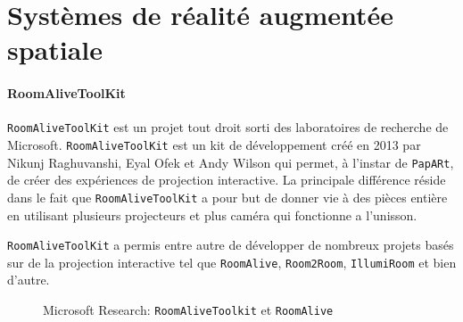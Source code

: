 \section{Systèmes de réalité augmentée spatiale}
\label{sec:SARother}
\paragraph{RoomAliveToolKit} \texttt{RoomAliveToolKit}\cite{Jones:2014:RME:2642918.2647383} est un projet tout droit sorti des laboratoires de recherche de Microsoft. \texttt{RoomAliveToolKit} est un kit de développement créé en 2013 par Nikunj Raghuvanshi, Eyal Ofek et Andy Wilson qui permet, à l'instar de \texttt{\texttt{PapARt}}, de créer des expériences de projection interactive. La principale différence réside dans le fait que \texttt{RoomAliveToolKit} a pour but de donner vie à des pièces entière en utilisant plusieurs projecteurs et plus caméra qui fonctionne a l'unisson.

\texttt{RoomAliveToolKit} a permis entre autre de développer de nombreux projets basés sur de la projection interactive tel que \texttt{RoomAlive}, \texttt{Room2Room}, \texttt{IllumiRoom} et bien d'autre.

\begin{figure}[H]
    \centering
\caption{Microsoft Research: \texttt{RoomAliveToolkit} et \texttt{RoomAlive}\protect\footnotemark}
\label{fig:roomalive}
\end{figure}

